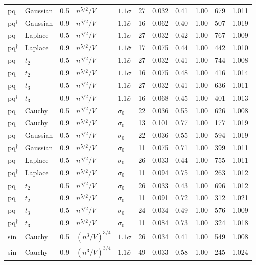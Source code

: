 \begin{longtable}{lllllcccccc}
pq & Gaussian & 0.5 & $n^{5/2}/V$ & $1.1\bar\sigma$ & 27 & 0.032 & 0.41 & 1.00 & 679 & 1.011 \\
pq$^\dagger$ & Gaussian & 0.9 & $n^{5/2}/V$ & $1.1\bar\sigma$ & 16 & 0.062 & 0.40 & 1.00 & 507 & 1.019 \\
pq & Laplace & 0.5 & $n^{5/2}/V$ & $1.1\bar\sigma$ & 27 & 0.032 & 0.42 & 1.00 & 767 & 1.009 \\
pq$^\dagger$ & Laplace & 0.9 & $n^{5/2}/V$ & $1.1\bar\sigma$ & 17 & 0.075 & 0.44 & 1.00 & 442 & 1.010 \\
pq & $t_2$ & 0.5 & $n^{5/2}/V$ & $1.1\bar\sigma$ & 27 & 0.032 & 0.41 & 1.00 & 744 & 1.008 \\
pq & $t_2$ & 0.9 & $n^{5/2}/V$ & $1.1\bar\sigma$ & 16 & 0.075 & 0.48 & 1.00 & 416 & 1.014 \\
pq & $t_3$ & 0.5 & $n^{5/2}/V$ & $1.1\bar\sigma$ & 27 & 0.032 & 0.41 & 1.00 & 636 & 1.011 \\
pq$^\dagger$ & $t_3$ & 0.9 & $n^{5/2}/V$ & $1.1\bar\sigma$ & 16 & 0.068 & 0.45 & 1.00 & 401 & 1.013 \\
pq & Cauchy & 0.5 & $n^{5/2}/V$ & $\sigma_0$ & 22 & 0.036 & 0.55 & 1.00 & 626 & 1.008 \\
pq & Cauchy & 0.9 & $n^{5/2}/V$ & $\sigma_0$ & 13 & 0.101 & 0.77 & 1.00 & 177 & 1.019 \\
pq & Gaussian & 0.5 & $n^{5/2}/V$ & $\sigma_0$ & 22 & 0.036 & 0.55 & 1.00 & 594 & 1.019 \\
pq$^\dagger$ & Gaussian & 0.9 & $n^{5/2}/V$ & $\sigma_0$ & 11 & 0.075 & 0.71 & 1.00 & 399 & 1.011 \\
pq & Laplace & 0.5 & $n^{5/2}/V$ & $\sigma_0$ & 26 & 0.033 & 0.44 & 1.00 & 755 & 1.011 \\
pq$^\dagger$ & Laplace & 0.9 & $n^{5/2}/V$ & $\sigma_0$ & 11 & 0.094 & 0.75 & 1.00 & 263 & 1.012 \\
pq & $t_2$ & 0.5 & $n^{5/2}/V$ & $\sigma_0$ & 26 & 0.033 & 0.43 & 1.00 & 696 & 1.012 \\
pq & $t_2$ & 0.9 & $n^{5/2}/V$ & $\sigma_0$ & 11 & 0.091 & 0.72 & 1.00 & 312 & 1.021 \\
pq & $t_3$ & 0.5 & $n^{5/2}/V$ & $\sigma_0$ & 24 & 0.034 & 0.49 & 1.00 & 576 & 1.009 \\
pq$^\dagger$ & $t_3$ & 0.9 & $n^{5/2}/V$ & $\sigma_0$ & 11 & 0.084 & 0.73 & 1.00 & 324 & 1.018 \\
sin & Cauchy & 0.5 & $(n^3/V)^{3/4}$ & $1.1\bar\sigma$ & 26 & 0.034 & 0.41 & 1.00 & 549 & 1.008 \\
sin & Cauchy & 0.9 & $(n^3/V)^{3/4}$ & $1.1\bar\sigma$ & 49 & 0.033 & 0.58 & 1.00 & 245 & 1.024 \\

\end{longtable}
